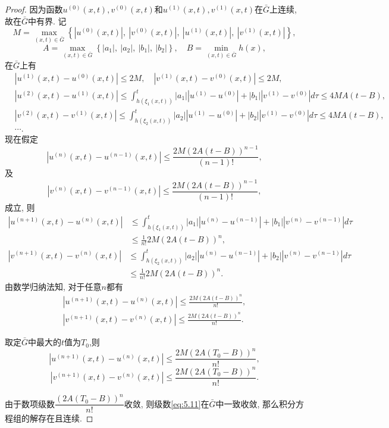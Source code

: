 \begin{proof}
	因为函数$u^{(0)}(x,t),v^{(0)}(x,t)$和$u^{(1)}(x,t),v^{(1)}(x,t)$在$\bar{G}$上连续, 故在$\bar{G}$中有界. 记
	$$M=\max_{(x,t)\in\bar{G}}\left\{\left|u^{(0)}(x,t)\right|,\:\left|v^{(0)}(x,t)\right|,\:\left|u^{(1)}(x,t)\right|,\:\left|v^{(1)}(x,t)\right|\right\},$$
	$$A=\max_{(x,t)\in\bar{G}}\left\{|a_{1}|,\:|a_{2}|,\:|b_{1}|,\:|b_{2}|\right\},\quad B=\min_{(x,t)\in\bar{G}}h(x),$$
	在$\bar{G}$上有
	$$\begin{aligned}
		&\left|u^{(1)}(x,t)-u^{(0)}(x,t)\right|\leq2M,\quad\left|v^{(1)}(x,t)-v^{(0)}(x,t)\right|\leq2M,\\
		&\left|u^{(2)}(x,t)-u^{(1)}(x,t)\right|\leq\int_{h(\xi_{1}(x,t))}^{t}|a_{1}|\left|u^{(1)}-u^{(0)}\right|+|b_{1}|\left|v^{(1)}-v^{(0)}\right|d\tau\leq4MA(t-B),\\
		&\left|v^{(2)}(x,t)-v^{(1)}(x,t)\right|\leq\int_{h(\xi_{2}(x,t))}^{t}|a_{2}|\left|u^{(1)}-u^{(0)}\right|+|b_{2}|\left|v^{(1)}-v^{(0)}\right|d\tau\leq4MA(t-B),\\
		&\cdots.
	\end{aligned}$$
	现在假定
	$$\left|u^{(n)}(x,t)-u^{(n-1)}(x,t)\right|\leq\frac{2M(2A(t-B))^{n-1}}{(n-1)!},$$
	及
	$$\left|v^{(n)}(x,t)-v^{(n-1)}(x,t)\right|\leq\frac{2M(2A(t-B))^{n-1}}{(n-1)!},$$
	成立, 则
	$$\begin{aligned}
		\left|u^{(n+1)}(x,t)-u^{(n)}(x,t)\right|&\leq\int_{h(\xi_{1}(x,t))}^{t}|a_{1}|\left|u^{(n)}-u^{(n-1)}\right|+|b_{1}|\left|v^{(n)}-v^{(n-1)}\right|d\tau\\
		&\leq\frac{1}{n!}2M(2A(t-B))^{n},
	\end{aligned}$$
	$$\begin{aligned}
		\left|v^{(n+1)}(x,t)-v^{(n)}(x,t)\right|&\leq\int_{h(\xi_{2}(x,t))}^{t}|a_{2}|\left|u^{(n)}-u^{(n-1)}\right|+|b_{2}|\left|v^{(n)}-v^{(n-1)}\right|d\tau\\
		&\leq\frac{1}{n!}2M(2A(t-B))^{n}.
	\end{aligned}$$
	由数学归纳法知, 对于任意$n$都有
	$$\begin{aligned}
		\left|u^{(n+1)}(x,t)-u^{(n)}(x,t)\right|\leq\frac{2M(2A(t-B))^{n}}{n!},\\
		\left|v^{(n+1)}(x,t)-v^{(n)}(x,t)\right|\leq\frac{2M(2A(t-B))^{n}}{n!}.
	\end{aligned}$$

	取定$\bar{G}$中最大的$t$值为$T_0$,则
	$$\left|u^{(n+1)}(x,t)-u^{(n)}(x,t)\right|\leq\frac{2M(2A(T_0-B))^n}{n!},$$
	$$\left|v^{(n+1)}(x,t)-v^{(n)}(x,t)\right|\leq\frac{2M(2A(T_0-B))^n}{n!}.$$
	
	由于数项级数$\dfrac{(2A(T_0-B))^n}{n!}$收敛, 则级数\eqref{eq:5.11}在$\bar{G}$中一致收敛, 那么积分方程组的解存在且连续.
	

\end{proof}
